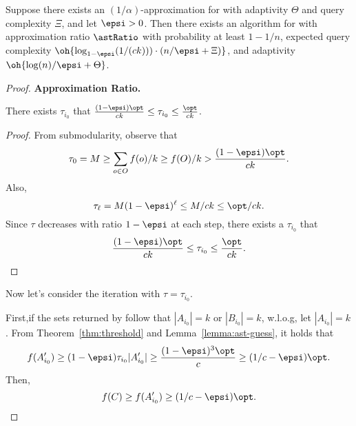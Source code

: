 \begin{theorem} 
    \label{thm:ast}
Suppose there exists an $(1/\alpha )$-approximation for
\unc with adaptivity $\Theta$ and query complexity
$\Xi$, and let $\epsi> 0$.
Then there exists an algorithm for \sm with
approximation ratio $\astRatio$ with probability
at least $1 - 1/n$, expected query complexity
$\oh{ \log_{1 - \epsi}(1/(ck))) \cdot \left( n / \epsi + \Xi \right) }$,
and adaptivity $\oh{\log( n) / \epsi + \Theta }$.  
\end{theorem}
\begin{proof}
    \textbf{Approximation Ratio.}
    \begin{lemma} \label{lemma:ast-guess}
        There exists $\tau_{i_0}$ that $\frac{(1-\epsi)\opt}{ck}\le \tau_{i_0}\le \frac{\opt}{ck}$.
    \end{lemma}
    \begin{proof}
        From submodularity, observe that 
        $$\tau_0=M\ge \sum_{o\in O}f(o)/k\ge f(O)/k > \frac{(1-\epsi)\opt}{ck}.$$
        Also,
        $$\tau_\ell=M(1-\epsi)^\ell\le M/ck \le \opt/ck.$$ 
        Since $\tau$ decreases with ratio $1-\epsi$ at each step, there exists a $\tau_{i_0}$ that
        $$\frac{(1-\epsi)\opt}{ck}\le \tau_{i_0}\le \frac{\opt}{ck}.$$
    \end{proof}
    
    Now let's consider the iteration with $\tau=\tau_{i_0}$.

    First,if the sets returned by \threseq follow that $|A_{i_0}|=k$ or $|B_{i_0}|=k$,
    w.l.o.g, let $|A_{i_0}|=k$.
    From Theorem~\ref{thm:threshold} and Lemma~\ref{lemma:ast-guess}, it holds that
    $$f(A_{i_0}')\ge(1-\epsi)\tau_{i_0}|A_{i_0}'|\ge \frac{(1-\epsi)^3\opt}{c}\ge (1/c-\epsi)\opt.$$
    Then,
    $$f(C)\ge f(A_{i_0}') \ge (1/c-\epsi)\opt.$$


\end{proof}
